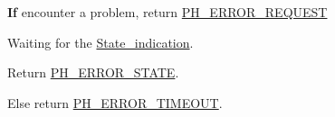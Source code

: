 {\bfseries If} encounter a problem, return \hyperlink{group___p_h___error___code_ga76393e5665e76130e95c73aab378c53d}{P\+H\+\_\+\+E\+R\+R\+O\+R\+\_\+\+R\+E\+Q\+U\+E\+ST}

Waiting for the \hyperlink{group___u_a_r_t___control___from_ga736e177182335771d7948dd74a7a1a5f}{State\+\_\+indication}.

Return \hyperlink{group___p_h___error___code_ga495ce5ac265432fc88f35462ea1515f8}{P\+H\+\_\+\+E\+R\+R\+O\+R\+\_\+\+S\+T\+A\+TE}.

Else return \hyperlink{group___p_h___error___code_gaae8d2172a18fdde6957c77af378c2574}{P\+H\+\_\+\+E\+R\+R\+O\+R\+\_\+\+T\+I\+M\+E\+O\+UT}. 